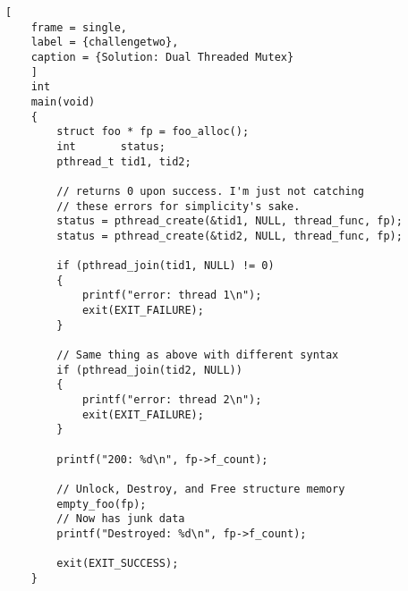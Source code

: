 \documentclass{article}
\begin{document}
\begin{lstlisting}[
    frame = single,
    label = {challengetwo},
    caption = {Solution: Dual Threaded Mutex}
    ]
    int
    main(void)
    {
        struct foo * fp = foo_alloc();
        int 	  status;
        pthread_t tid1, tid2;

        // returns 0 upon success. I'm just not catching 
        // these errors for simplicity's sake.
        status = pthread_create(&tid1, NULL, thread_func, fp);
        status = pthread_create(&tid2, NULL, thread_func, fp);

        if (pthread_join(tid1, NULL) != 0)
        {
            printf("error: thread 1\n");
            exit(EXIT_FAILURE);
        }

        // Same thing as above with different syntax
        if (pthread_join(tid2, NULL))
        {
            printf("error: thread 2\n");
            exit(EXIT_FAILURE);
        }

        printf("200: %d\n", fp->f_count);

        // Unlock, Destroy, and Free structure memory
        empty_foo(fp);
        // Now has junk data
        printf("Destroyed: %d\n", fp->f_count);

        exit(EXIT_SUCCESS);
    }

\end{lstlisting}
\end{document}
